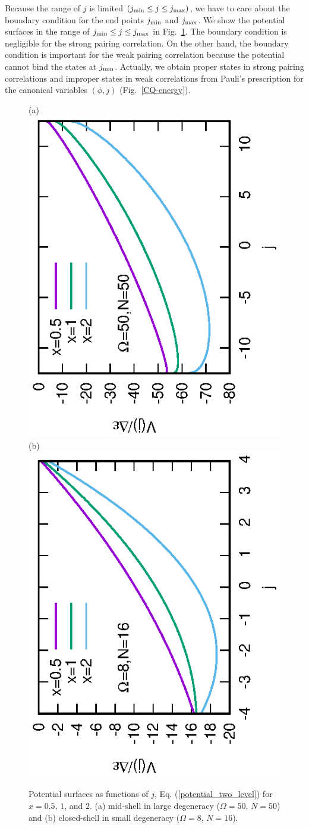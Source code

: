 \documentclass[11pt]{book} %
\begin{document}
Because the range of $j$ is limited $(j_{\rm min}\le j \le j_{\rm max})$, we have to care about the boundary condition for the end points $j_{\rm min}$ and $j_{\rm max}$. We show the potential surfaces in the range of $j_{\rm min}\le j \le j_{\rm max}$ in Fig.~\ref{PES}. The boundary condition is negligible for the strong pairing correlation. On the other hand, the boundary condition is important for the weak pairing correlation because the potential cannot bind the states at $j_{\rm min}$. Actually, we obtain proper states in strong pairing correlations and improper states in weak correlations from Pauli's prescription for the canonical variables $(\phi, j)$ (Fig.~\ref{CQ-energy}).

\begin{figure}[tb]
 \begin{center}
(a) \includegraphics[height=0.44\textwidth,angle=-90]{images/N50potential.eps}
(b) \includegraphics[height=0.44\textwidth,angle=-90]{images/N16potential.eps}
 \end{center}
 \caption{Potential surfaces as functions of $j$,
 Eq. (\ref{potential_two_level}) for $x=0.5$, $1$, and $2$.
 (a) mid-shell in large degeneracy ($\Omega=50$, $N=50$) and (b) closed-shell in small degeneracy ($\Omega=8$, $N=16$).
}
 \label{PES}
\end{figure}
\end{document}

